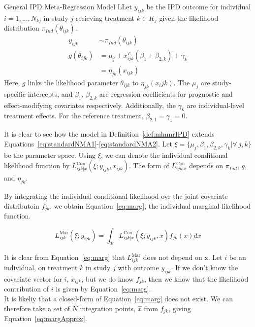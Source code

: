 \begin{definition}{General IPD Meta-Regression Model}
    LLet $y_{ijk}$ be the IPD outcome for individual $i = 1, \ldots, N_{kj}$ in study $j$ recieving treatment $k \in K_j$ given the likelihood distribution $\pi_{Ind}(\theta_{ijk})$. 
    \begin{align*}
        y_{ijk} &\sim \pi_{Ind}(\theta_{ijk}) \\
        g(\theta_{ijk}) &= \mu_j + x^T_{ijk}(\beta_1 + \beta_{2,k}) + \gamma_k \\
                        &= \eta_{jk}(x_{ijk})
    \end{align*}
    Here, $g$ links the likelihood parameter $\theta_{ijk}$ to $\eta_{jk}(x_ijk)$. The $\mu_j$ are study-specific intercepts, and $\beta_1$, $\beta_{2,k}$ are regression coefficients for prognostic and effect-modifying covariates respectively. Additionally, the $\gamma_k$ are individual-level treatment effects. For the reference treatment, $\beta_{2,1} = \gamma_1 = 0$.
    \label{def:mlnmrIPD}
\end{definition}

It is clear to see how the model in Definition~\ref{def:mlnmrIPD} extends Equations~\ref{eq:standardNMA1}-\ref{eq:standardNMA2}. Let $\xi = \{\mu_j, \beta_1, \beta_{2,k}, \gamma_k | \forall \ j,k \}$ be the parameter space. Using $\xi$, we can denote the individual conditional likelihood function by $L_{ijk|x}^{\text{Con}}(\xi; y_{ijk}, x_{ijk})$. The form of $L_{ijk|x}^{\text{Con}}$ depends on $\pi_{Ind}$, $g$, and $\eta_{jk}$. 

By integrating the individual conditional likelihood ovr the joint covariate distributoin $f_{jk}$, we obtain Equation~\ref{eq:marg}, the individual marginal likelihood function.

\begin{equation}
    L_{ijk}^{\text{Mar}}(\xi; y_{ijk}) = \int_{\mathfrak{X}} L_{ijk|x}^{\text{Con}}(\xi; y_{ijk}, x)f_{jk}(x)dx
    \label{eq:marg}
\end{equation}

It is clear from Equation~\ref{eq:marg} that $L_{ijk}^{\text{Mar}}$ does not depend on x. Let $i$ be an individual, on treatment $k$ in study $j$ with outcome $y_{ijk}$. If we don't know the covariate vector for $i$, $x_{ijk}$, but we do know $f_{jk}$, then we know that the likelihood contribution of $i$ is given by Equation~\ref{eq:marg}. \\

It is likeliy that a closed-form of Equation~\ref{eq:marg} does not exist. We can therefore take a set of $N$ integration points, $\hat{x}$ from $f_{jk}$, giving Equation~\ref{eq:margApprox}.

